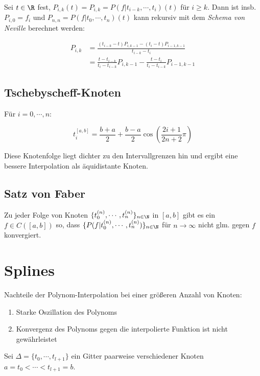 Sei $t \in \R$ fest, $P_{i,k}(t)=P_{i,k}=P(f|t_{i-k},\cdots,t_i)(t)$ für $i\geq k$. Dann ist insb. $P_{i,0}=f_i$ und $P_{n,n}=P(f|t_0,\cdots,t_n)(t)$ kann rekursiv mit dem \emph{Schema von Neville} berechnet werden:

\vspace{-4mm}
\begin{align*}
P_{i,k} &= \frac{(t_{i-k}-t)P_{i,k-1} - (t_i-t)P_{i-1,k-1}}{t_{i-k}-t_i} \\
        &= \frac{t-t_{i-k}}{t_i-t_{i-k}} P_{i,k-1} - \frac{t-t_i}{t_i-t_{i-k}} P_{i-1,k-1}
\end{align*}

\subsection*{Tschebyscheff-Knoten}

Für $i = 0,\cdots,n$:

\vspace{-2mm}
$$t_i^{[a,b]} = \frac{b+a}{2} + \frac{b-a}{2} \cos\left(\frac{2i+1}{2n+2} \pi\right)$$

Diese Knotenfolge liegt dichter zu den Intervallgrenzen hin und ergibt eine bessere Interpolation als äquidistante Knoten.

\subsection*{Satz von Faber}

Zu jeder Folge von Knoten $\{t_0^{(n)},\cdots,t_n^{(n)}\}_{n \in \N}$ in $[a,b]$ gibt es ein $f \in C([a,b])$ so, dass $\{P(f|t_0^{(n)},\cdots,t_n^{(n)})\}_{n \in \N}$ für $n \to \infty$ nicht glm. gegen $f$ konvergiert.

\section*{Splines}

Nachteile der Polynom-Interpolation bei einer größeren Anzahl von Knoten:

\begin{enumerate}
	\item Starke Oszillation des Polynoms
	\item Konvergenz des Polynoms gegen die interpolierte Funktion ist nicht gewährleistet
\end{enumerate}

Sei $\Delta = \{t_0,\cdots,t_{l+1}\}$ ein Gitter paarweise verschiedener Knoten $a=t_0 < \cdots < t_{l+1} = b$.

